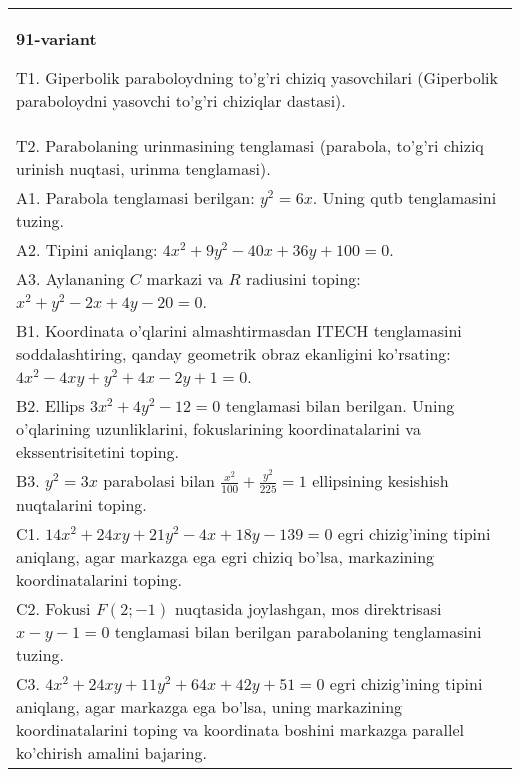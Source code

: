 \documentclass{article}
\begin{document}
\begin{tabular}{m{17cm}}
\textbf{91-variant}
\newline

T1. Giperbolik paraboloydning to'g'ri chiziq yasovchilari (Giperbolik paraboloydni yasovchi to'g'ri chiziqlar dastasi).\\

T2. Parabolaning urinmasining tenglamasi (parabola, to'g'ri chiziq urinish nuqtasi, urinma tenglamasi).\\

A1. Parabola tenglamasi berilgan: $y^2=6x$. Uning qutb tenglamasini tuzing.\\

A2. Tipini aniqlang: $4x^2+9y^2-40x+36y+100=0$.\\

A3. Aylananing $C$ markazi va $R$ radiusini toping: $x^2+y^2-2x+4y-20=0$.\\

B1. Koordinata o'qlarini almashtirmasdan ITECH tenglamasini soddalashtiring, qanday geometrik obraz ekanligini ko'rsating: $4x^{2} - 4xy + y^{2} + 4x - 2y + 1 = 0$.  \\

B2. Ellips $3x^{2} + 4y^{2} - 12 = 0$ tenglamasi bilan berilgan. Uning o'qlarining uzunliklarini, fokuslarining koordinatalarini va ekssentrisitetini toping.  \\

B3. $y^{2} = 3x$ parabolasi bilan $\frac{x^{2}}{100} + \frac{y^{2}}{225} = 1$ ellipsining kesishish nuqtalarini toping.  \\

C1. $14x^{2} + 24xy + 21y^{2} - 4x + 18y - 139 = 0$ egri chizig'ining tipini aniqlang, agar markazga ega egri chiziq bo'lsa, markazining koordinatalarini toping.  \\

C2. Fokusi $F(2; - 1)$ nuqtasida joylashgan, mos direktrisasi $x - y - 1 = 0$ tenglamasi bilan berilgan parabolaning tenglamasini tuzing.  \\

C3. $4x^{2} + 24xy + 11y^{2} + 64x + 42y + 51 = 0$ egri chizig'ining tipini aniqlang, agar markazga ega bo'lsa, uning markazining koordinatalarini toping va koordinata boshini markazga parallel ko'chirish amalini bajaring.\\

\end{tabular}
\vspace{1cm}
\end{document}
